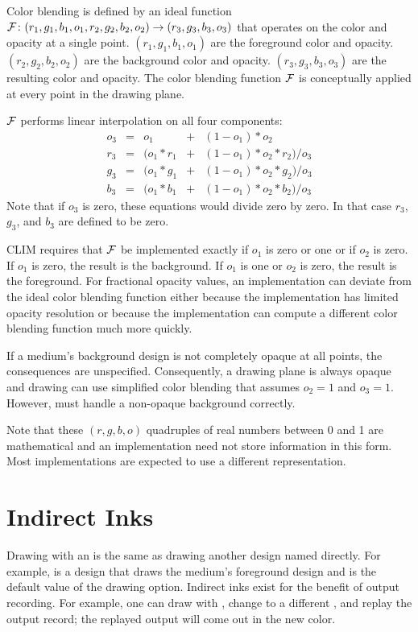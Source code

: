 Color blending is defined by an ideal function
${\cal F}\colon (r_1,g_1,b_1,o_1,r_2,g_2,b_2,o_2)\rightarrow (r_3,g_3,b_3,o_3)$
that operates on the color and opacity at a single point.
$(r_1,g_1,b_1,o_1)$ are the foreground color and opacity.
$(r_2,g_2,b_2,o_2)$ are the background color and opacity.
$(r_3,g_3,b_3,o_3)$ are the resulting color and opacity.  The color
blending function ${\cal F}$ is conceptually applied at every point in the
drawing plane.

${\cal F}$ performs linear interpolation on all four components:
\[ \begin{array}{rcrcl}
o_3 & = &        o_1 & + & (1 - o_1) * o_2 \\
r_3 & = & (o_1 * r_1 & + & (1 - o_1) * o_2 * r_2) / o_3 \\
g_3 & = & (o_1 * g_1 & + & (1 - o_1) * o_2 * g_2) / o_3 \\
b_3 & = & (o_1 * b_1 & + & (1 - o_1) * o_2 * b_2) / o_3
\end{array} \]
Note that if $o_3$ is zero, these equations would divide zero by zero.
In that case $r_3$, $g_3$, and $b_3$ are defined to be zero.

CLIM requires that ${\cal F}$ be implemented exactly if $o_1$ is zero or one or
if $o_2$ is zero.  If $o_1$ is zero, the result is the background.  If $o_1$ is
one or $o_2$ is zero, the result is the foreground.  For fractional opacity
values, an implementation can deviate from the ideal color blending function
either because the implementation has limited opacity resolution or because the
implementation can compute a different color blending function much more
quickly.

If a medium's background design is not completely opaque at all points, the
consequences are unspecified.  Consequently, a drawing plane is always opaque
and drawing can use simplified color blending that assumes $o_2 = 1$ and
$o_3 = 1$.  However,  must handle a non-opaque background
correctly. 

Note that these $(r,g,b,o)$ quadruples of real numbers between 0 and 1 are
mathematical and an implementation need not store information in this form.
Most implementations are expected to use a different representation.


\section {Indirect Inks}

Drawing with an  is the same as drawing another design
named directly.  For example,  is a design that draws the
medium's foreground design and is the default value of the  drawing
option.  Indirect inks exist for the benefit of output recording.  For example,
one can draw with , change to a different
, and replay the output record; the replayed output will
come out in the new color.

